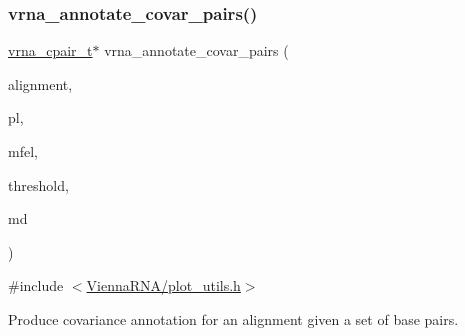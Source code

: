 \subsubsection{\texorpdfstring{vrna\+\_\+annotate\+\_\+covar\+\_\+pairs()}{vrna\_annotate\_covar\_pairs()}}
{\footnotesize\ttfamily \mbox{\hyperlink{group__data__structures_gae4fc91141cc69c6d8eaf1332cb991ecc}{vrna\+\_\+cpair\+\_\+t}}$\ast$ vrna\+\_\+annotate\+\_\+covar\+\_\+pairs (\begin{DoxyParamCaption}\item[{const char $\ast$$\ast$}]{alignment,  }\item[{\mbox{\hyperlink{group__struct__utils_gab9ac98ab55ded9fb90043b024b915aca}{vrna\+\_\+ep\+\_\+t}} $\ast$}]{pl,  }\item[{\mbox{\hyperlink{group__struct__utils_gab9ac98ab55ded9fb90043b024b915aca}{vrna\+\_\+ep\+\_\+t}} $\ast$}]{mfel,  }\item[{double}]{threshold,  }\item[{\mbox{\hyperlink{group__model__details_ga1f8a10e12a0a1915f2a4eff0b28ea17c}{vrna\+\_\+md\+\_\+t}} $\ast$}]{md }\end{DoxyParamCaption})}



{\ttfamily \#include $<$\mbox{\hyperlink{plot__utils_8h}{Vienna\+R\+N\+A/plot\+\_\+utils.\+h}}$>$}



Produce covariance annotation for an alignment given a set of base pairs. 

